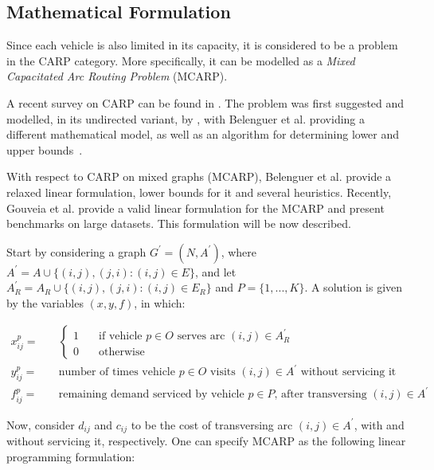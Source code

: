 \subsection{Mathematical Formulation}

Since each vehicle is also limited in its capacity, it is considered to be a
problem in the CARP category. More specifically, it can be modelled as a
\textit{Mixed Capacitated Arc Routing Problem} (MCARP).

A recent survey on CARP can be found in \citet{Wohlk08}. The problem was first
suggested and modelled, in its undirected variant, by \cite{Golden81}, with
Belenguer et al. providing a different mathematical model, as well as an
algorithm for determining lower and upper
bounds~\citep{Belenguer98,Belenguer03}.

With respect to CARP on mixed graphs (MCARP), Belenguer et
al.\citep{Belenguer06} provide a relaxed linear formulation, lower bounds for
it and several heuristics. Recently, Gouveia et al.\citep{Gouveia10} provide a
valid linear formulation for the MCARP and present benchmarks on large
datasets. This formulation will be now described.

Start by considering a graph $G^\prime = (N, A^\prime)$, where $A^\prime = A
\cup \{(i,j),(j,i) : (i,j) \in E\}$, and let $A^{\prime}_R = A_R \cup
\{(i,j),(j,i) : (i,j) \in E_R\}$ and $P = \{1, ..., K\}$. A solution is given
by the variables $(x, y, f)$, in which:

\begin{align*}
x_{ij}^p = & \quad \left\{
	\begin{array}{ll}
		1 & \quad \mbox{if vehicle $p \in O$ serves arc $(i,j) \in A^{\prime}_R$} \\
		0 & \quad \mbox{otherwise}
	\end{array}
	\right. \\
y_{ij}^p = & \quad \mbox{number of times vehicle $p \in O$ visits $(i,j) \in A^{\prime}$ without servicing it} \\
f_{ij}^p = & \quad \mbox{remaining demand serviced by vehicle $p \in P$, after transversing $(i,j) \in A^\prime$}
\end{align*}

Now, consider $d_{ij}$ and $c_{ij}$ to be the cost of transversing arc $(i,j)
\in A^\prime$, with and without servicing it, respectively. One can specify
MCARP as the following linear programming formulation:

